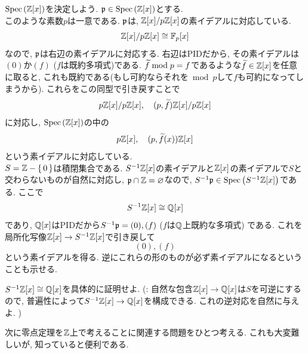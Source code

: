 \begin{eg}
$\mathrm{Spec}\left( \mathbb{Z}[x] \right)$を決定しよう. $\mathfrak{p}\in \mathrm{Spec}\left( \mathbb{Z}[x] \right)$とする. \\
 このような素数$p$は一意である. $\mathfrak{p}$は, $\mathbb{Z}[x]/p\mathbb{Z}[x]$の素イデアルに対応している.
\[\mathbb{Z}[x]/p\mathbb{Z}[x] \cong \mathbb{F}_{p}[x]\]
なので, $\mathfrak{p}$は右辺の素イデアルに対応する. 右辺はPIDだから, その素イデアルは$(0)$か$(f)$ ($f$は既約多項式)である. $\widetilde{f} \bmod{p} = f$であるような$\widetilde{f} \in \mathbb{Z}[x]$を任意に取ると, これも既約である(もし可約ならそれを$\bmod{p}$して$f$も可約になってしまうから). これらをこの同型で引き戻すことで
\[p\mathbb{Z}[x]/p\mathbb{Z}[x],\quad (p,\widetilde{f})\mathbb{Z}[x]/p\mathbb{Z}[x]\]
に対応し, $\mathrm{Spec}\left( \mathbb{Z}[x] \right)$の中の
\[p\mathbb{Z}[x], \quad (p,\widetilde{f}(x))\mathbb{Z}[x]\]
という素イデアルに対応している. \\
 $S=\mathbb{Z}-\set{0}$は積閉集合である.  $S^{-1}\mathbb{Z}[x]$の素イデアルと$\mathbb{Z}[x]$の素イデアルで$S$と交わらないものが自然に対応し, $\mathfrak{p}\cap \mathbb{Z} = \varnothing$なので, $S^{-1}\mathfrak{p} \in \mathrm{Spec}\left( S^{-1}\mathbb{Z}[x] \right)$である. ここで
\[S^{-1}\mathbb{Z}[x] \cong \mathbb{Q}[x]\]
であり, $\mathbb{Q}[x]$はPIDだから$S^{-1}\mathfrak{p} = (0), (f)$ ($f$は$\mathbb{Q}$上既約な多項式) である. これを局所化写像$\mathbb{Z}[x]\to S^{-1}\mathbb{Z}[x]$で引き戻して
\[(0), (f)\]
という素イデアルを得る. 逆にこれらの形のものが必ず素イデアルになるということも示せる.
\end{eg}
\begin{prac}
$S^{-1}\mathbb{Z}[x]\cong \mathbb{Q}[x]$を具体的に証明せよ. (: 自然な包含$\mathbb{Z}[x]\to \mathbb{Q}[x]$は$S$を可逆にするので, 普遍性によって$S^{-1}\mathbb{Z}[x]\to \mathbb{Q}[x]$を構成できる. これの逆対応を自然に与えよ. )
\end{prac}



























次に零点定理を$\mathbb{Z}$上で考えることに関連する問題をひとつ考える. これも大変難しいが, 知っていると便利である.


